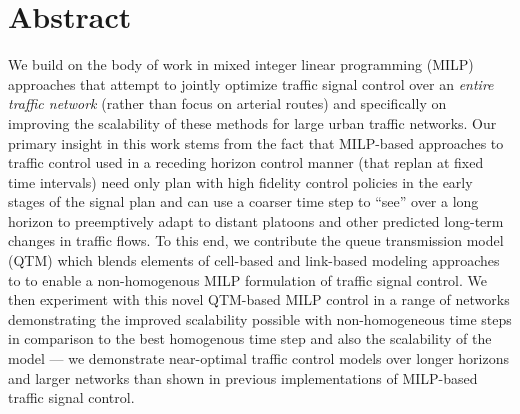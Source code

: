 \section*{Abstract}


We build on the body of work in mixed integer linear programming
(MILP) approaches that attempt to jointly optimize traffic signal
control over an \emph{entire traffic network} (rather than focus on
arterial routes) and specifically on improving the scalability of
these methods for large urban traffic networks.  Our primary insight
in this work stems from the fact that MILP-based approaches to traffic
control used in a receding horizon control manner (that replan at
fixed time intervals) need only plan with high fidelity control
policies in the early stages of the signal plan and can use a coarser
time step to ``see'' over a long horizon to preemptively adapt to
distant platoons and other predicted long-term changes in traffic
flows.  To this end, we contribute the queue transmission model (QTM)
which blends elements of cell-based and link-based modeling approaches
to to enable a non-homogenous MILP formulation of traffic signal
control.  We then experiment with this novel QTM-based MILP control in
a range of networks demonstrating the improved scalability possible
with non-homogeneous time steps in comparison to the best homogenous
time step and also the scalability of the model --- we demonstrate
near-optimal traffic control models over longer horizons and larger
networks than shown in previous implementations of MILP-based traffic
signal control.

